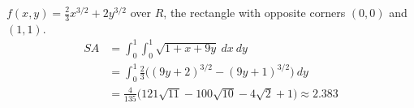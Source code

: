 {$f(x,y) = \frac23x^{3/2}+2y^{3/2}$ over $R$, the rectangle with opposite corners $(0,0)$ and $(1,1)$.
}
{
\begin{align*}SA &= \int_{0}^{1}\int_{0}^{1} \sqrt{1+ x+9y}\ dx\ dy\\
		&= \int_0^{1}\frac23\Big((9y+2)^{3/2}-(9y+1)^{3/2}\Big)\ dy \\
		&= \frac{4}{135}\big(121\sqrt{11}-100\sqrt{10}-4\sqrt{2}+1\big)\approx 2.383
\end{align*}
}